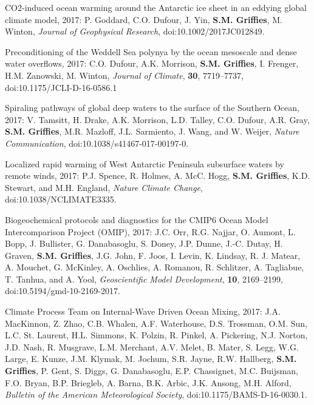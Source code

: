 \begin{etaremune}
\item CO2-induced ocean warming around the Antarctic ice sheet in an eddying global climate model, 2017: P. Goddard, C.O. Dufour, J. Yin, {\bf S.M. Grif\/f\/ies}, M. Winton, {\it Journal of Geophysical Research}, doi:10.1002/2017JC012849. 

\item Preconditioning of the Weddell Sea polynya by the ocean mesoscale and dense water overflows, 2017: C.O. Dufour, A.K. Morrison, {\bf S.M. Grif\/f\/ies}, I. Frenger, H.M. Zanowski, M. Winton, {\it Journal of Climate}, {\bf 30}, 7719--7737, doi:10.1175/JCLI-D-16-0586.1

\item Spiraling pathways of global deep waters to the surface of the Southern Ocean, 2017: V. Tamsitt, H.  Drake, A.K. Morrison, L.D. Talley, C.O. Dufour, A.R. Gray, {\bf S.M. Grif\/f\/ies}, M.R. Mazloff, J.L. Sarmiento, J. Wang, and W. Weijer, {\it Nature Communication}, doi:10.1038/s41467-017-00197-0.

\item Localized rapid warming of West Antarctic Peninsula subsurface waters by remote winds, 2017: P.J. Spence, R. Holmes, A. McC. Hogg,   {\bf S.M. Grif\/f\/ies}, K.D. Stewart, and M.H. England, {\it Nature Climate Change}, doi:10.1038/NCLIMATE3335.

\item Biogeochemical protocols and diagnostics for the CMIP6 Ocean Model Intercomparison Project (OMIP), 2017: J.C. Orr, R.G. Najjar, O. Aumont, L.  Bopp, J. Bullister, G. Danabasoglu, S. Doney,  J.P. Dunne, J.-C. Dutay, H. Graven, {\bf S.M. Grif\/f\/ies}, J.G. John, F. Joos, I. Levin, K. Lindsay, R. J. Matear, A. Mouchet, G. McKinley, A. Oschlies, A. Romanou, R. Schlitzer, A. Tagliabue, T. Tanhua, and A. Yool, {\it Geoscientific Model Development}, {\bf 10}, 2169--2199, doi:10.5194/gmd-10-2169-2017.

\item Climate Process Team on Internal-Wave Driven Ocean Mixing, 2017:  J.A. MacKinnon,
Z. Zhao, C.B. Whalen, A.F. Waterhouse, D.S. Trossman, O.M. Sun, L.C. St. Laurent, H.L. Simmons, K. Polzin, R. Pinkel, A. Pickering, 
N.J. Norton, J.D. Nash, R. Musgrave, L.M. Merchant, A.V. Melet, B. Mater, S. Legg, 
W.G. Large, E. Kunze, J.M. Klymak,  M. Jochum, S.R. Jayne, R.W. Hallberg, {\bf S.M. Grif\/f\/ies}, P. Gent, S. Diggs, G. Danabasoglu, E.P. Chassignet, M.C. Buijsman, 
 F.O. Bryan, B.P. Briegleb, A. Barna, B.K. Arbic,  J.K. Ansong, M.H. Alford, {\it Bulletin of the American Meteorological Society}, doi:10.1175/BAMS-D-16-0030.1.


\end{etaremune}
